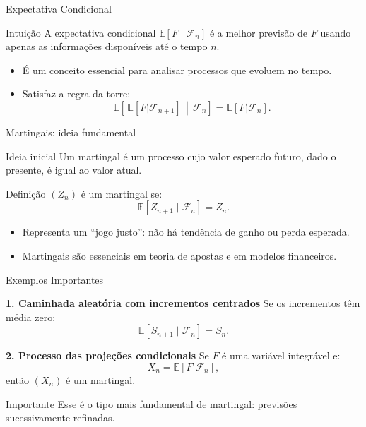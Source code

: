 \documentclass{beamer}
\begin{document}
\begin{frame}{Expectativa Condicional}
  \begin{block}{Intuição}
    A expectativa condicional $\mathbb{E}[F \mid \mathcal{F}_n]$ é a melhor previsão de $F$
    usando apenas as informações disponíveis até o tempo $n$.
  \end{block}

  \begin{itemize}
    \item É um conceito essencial para analisar processos que evoluem no tempo.
    \item Satisfaz a regra da torre:
    \[
       \mathbb{E}\!\left[\,\mathbb{E}[F|\mathcal{F}_{n+1}]\,\middle|\,\mathcal{F}_n\right]
       = \mathbb{E}[F|\mathcal{F}_n].
    \]
  \end{itemize}
\end{frame}

\begin{frame}{Martingais: ideia fundamental}
\begin{block}{Ideia inicial}
Um martingal é um processo cujo valor esperado futuro, dado o presente, é igual ao valor atual.
\end{block}

\begin{block}{Definição}
$(Z_n)$ é um martingal se:
\[
   \mathbb{E}[Z_{n+1} \mid \mathcal{F}_n] = Z_n.
\]
\end{block}

\begin{itemize}
    \item Representa um “jogo justo”: não há tendência de ganho ou perda esperada.
    \item Martingais são essenciais em teoria de apostas e em modelos financeiros.
\end{itemize}
\end{frame}

\begin{frame}{Exemplos Importantes}

\textbf{1. Caminhada aleatória com incrementos centrados}  
Se os incrementos têm média zero:
\[
\mathbb{E}[S_{n+1} \mid \mathcal{F}_n] = S_n.
\]

\textbf{2. Processo das projeções condicionais}  
Se $F$ é uma variável integrável e:
\[
X_n = \mathbb{E}[F|\mathcal{F}_n],
\]
então $(X_n)$ é um martingal.

\begin{block}{Importante}
Esse é o tipo mais fundamental de martingal: previsões sucessivamente refinadas.
\end{block}
\end{frame}
\end{document}
